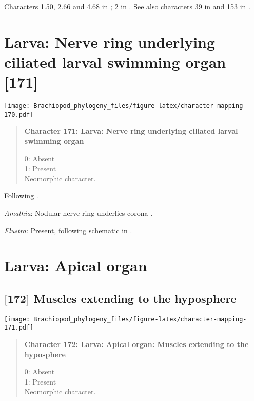 \documentclass[openany]{book}
\theoremstyle{definition}
\theoremstyle{definition}
\theoremstyle{definition}
\theoremstyle{remark}
\begin{document}
Characters 1.50, 2.66 and 4.68 in \citet{SPS1996}; 2 in
\citet{Vinther2008}. See also characters 39 in \citet{Haszprunar1996}
and 153 in \citet{Giribet2002}.

\section{Larva: Nerve ring underlying ciliated larval swimming organ
{[}171{]}}\label{larva-nerve-ring-underlying-ciliated-larval-swimming-organ-171}

\texttt{[image: Brachiopod\_phylogeny\_files/figure-latex/character-mapping-170.pdf]}

\begin{quote}
\textbf{Character 171: Larva: Nerve ring underlying ciliated larval
swimming organ}

0: Absent\\
1: Present\\
Neomorphic character.
\end{quote}

Following \citet{Wanninger2009}.

\hypertarget{Amathia-coding-171}{}
\emph{Amathia}: Nodular nerve ring underlies corona \citep{Reed1982}.

\hypertarget{Flustra-coding-171}{}
\emph{Flustra}: Present, following schematic in \citet{Gruhl2016}.

\section{Larva: Apical organ}\label{larva-apical-organ}

\subsection*{{[}172{]} Muscles extending to the
hyposphere}\label{muscles-extending-to-the-hyposphere}

\texttt{[image: Brachiopod\_phylogeny\_files/figure-latex/character-mapping-171.pdf]}

\begin{quote}
\textbf{Character 172: Larva: Apical organ: Muscles extending to the
hyposphere}

0: Absent\\
1: Present\\
Neomorphic character.
\end{quote}
\end{document}
